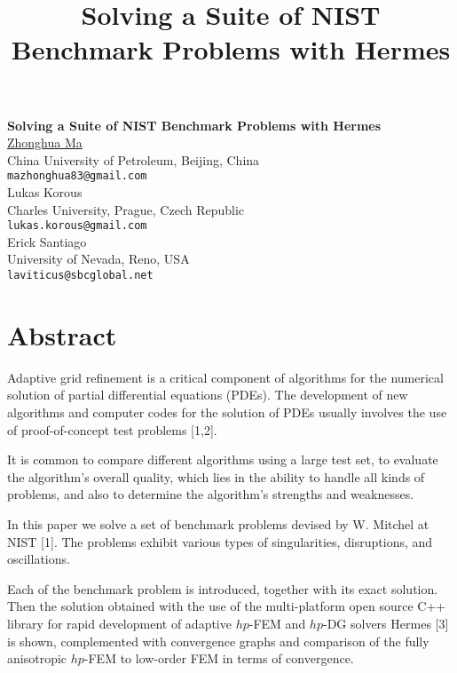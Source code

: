 \title{Solving a Suite of NIST Benchmark Problems with Hermes}
\author{} \institute{}

\begin{center}

\textbf{\Large Solving a Suite of NIST Benchmark Problems with Hermes}\\
\vspace{10mm}
{\large \underline{Zhonghua Ma}}\\
China University of Petroleum, Beijing, China\\
{\tt mazhonghua83@gmail.com}\\
\vspace{4mm}
{\large Lukas Korous}\\
Charles University, Prague, Czech Republic\\
{\tt lukas.korous@gmail.com}\\
\vspace{4mm}
{\large Erick Santiago}\\
University of Nevada, Reno, USA\\
{\tt laviticus@sbcglobal.net}

\end{center}

\section*{Abstract}

Adaptive grid refinement is a critical component of algorithms for the numerical solution of partial differential equations (PDEs). The development of new algorithms and computer codes for the solution of PDEs usually involves the use of proof-of-concept test problems [1,2].

It is common to compare different algorithms using a large test set, to evaluate the algorithm's overall quality, which lies in the ability to handle all kinds of problems, and also to determine the algorithm's strengths and weaknesses.

In this paper we solve a set of benchmark problems devised by W. Mitchel at NIST [1]. The problems exhibit various types of singularities, disruptions, and oscillations.

Each of the benchmark problem is introduced, together with its exact solution. Then the solution obtained with the use of the multi-platform open source C++ library for rapid development of adaptive $hp$-FEM and $hp$-DG solvers {\sc Hermes} [3] is shown, complemented with convergence graphs and comparison of the fully anisotropic $hp$-FEM to low-order FEM in terms of convergence.

